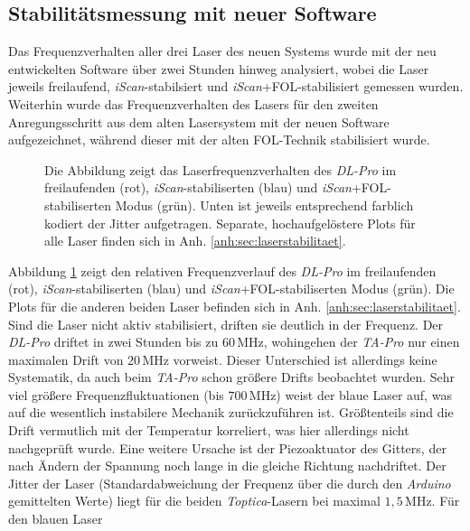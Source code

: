 \subsection{Stabilitätsmessung mit neuer
Software}\label{sec:stabilitaetsmessungen_software} Das Frequenzverhalten
aller drei Laser des neuen Systems wurde mit der neu entwickelten Software über zwei Stunden hinweg analysiert, wobei die
Laser jeweils freilaufend, \textit{iScan}-stabilsiert und
\textit{iScan}+FOL-stabilisiert gemessen wurden. Weiterhin wurde das
Frequenzverhalten des Lasers für den zweiten Anregungsschritt aus dem alten Lasersystem mit der neuen Software aufgezeichnet,
während dieser mit der alten FOL-Technik stabilisiert wurde.\par
\begin{figure}[h]
 	\centering
 	\footnotesize
	
	\caption[Laserfrequenzverhalten \textit{DL-Pro}]{Die Abbildung zeigt das
	Laserfrequenzverhalten des \textit{DL-Pro} im freilaufenden (rot),
	\textit{iScan}-stabiliserten (blau) und \textit{iScan}+FOL-stabiliserten Modus
	(grün).
	Unten ist jeweils entsprechend farblich kodiert der Jitter aufgetragen.
	Separate, hochaufgelöstere Plots für alle Laser finden sich in Anh.
	\ref{anh:sec:laserstabilitaet}.}
	\label{fig:laserstabilitaet_b_alles}
\end{figure}
Abbildung \ref{fig:laserstabilitaet_b_alles} zeigt den relativen
Frequenzverlauf des \textit{DL-Pro} im freilaufenden (rot),
\textit{iScan}-stabiliserten (blau) und \textit{iScan}+FOL-stabiliserten Modus
(grün). Die Plots für die anderen beiden Laser befinden sich in Anh.
\ref{anh:sec:laserstabilitaet}. Sind die Laser nicht aktiv stabilisiert, driften
sie deutlich in der Frequenz. Der \textit{DL-Pro} driftet in zwei Stunden bis zu $60\,$MHz, wohingehen der
\textit{TA-Pro} nur einen maximalen Drift von $20\,$MHz vorweist. Dieser
Unterschied ist allerdings keine Systematik, da auch beim \textit{TA-Pro} schon
größere Drifts beobachtet wurden. Sehr viel größere Frequenzfluktuationen (bis $700\,$MHz)
weist der blaue Laser auf, was auf die wesentlich instabilere Mechanik
zurückzuführen ist. Größtenteils sind die Drift vermutlich mit der Temperatur
korreliert, was hier allerdings nicht nachgeprüft wurde. Eine weitere Ursache
ist der Piezoaktuator des Gitters, der nach Ändern der Spannung noch lange in
die gleiche Richtung nachdriftet. Der Jitter der Laser (Standardabweichung der
Frequenz über die durch den \textit{Arduino} gemittelten Werte) liegt für die
beiden \textit{Toptica}-Lasern bei maximal $1,5\,$MHz. Für den blauen Laser
